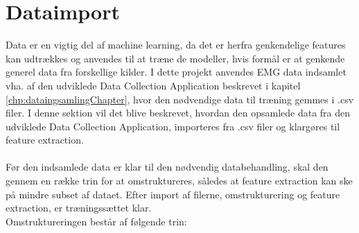 \section{Dataimport}
Data er en vigtig del af machine learning, da det er herfra genkendelige features kan udtrækkes og anvendes til at træne de modeller, hvis formål er at genkende generel data fra forskellige kilder. I dette projekt anvendes EMG data indsamlet vha. af den udviklede Data Collection Application beskrevet i kapitel \ref{chp:dataingsamlingChapter}, hvor den nødvendige data til træning gemmes i .csv filer. I denne sektion vil det blive beskrevet, hvordan den opsamlede data fra den udviklede Data Collection Application, importeres fra .csv filer og klargøres til feature extraction.
\\\\
Før den indsamlede data er klar til den nødvendig databehandling, skal den gennem en række trin for at omstruktureres, således at feature extraction kan ske på mindre subset af dataet. Efter import af filerne, omstrukturering og feature extraction, er træningssættet klar.  
\\ Omstruktureringen består af følgende trin:
